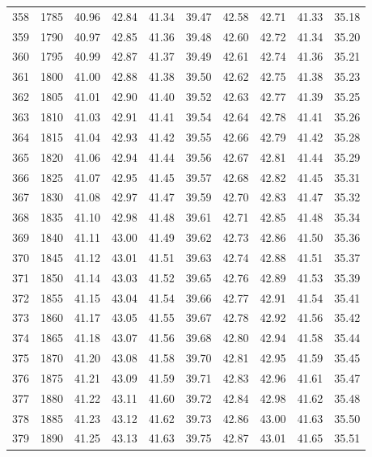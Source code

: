 \begin{longtable}{rrllllllll}
358 & 1785 & 40.96 & 42.84 & 41.34 & 39.47 & 42.58 & 42.71 & 41.33 & 35.18 \\ 
359 & 1790 & 40.97 & 42.85 & 41.36 & 39.48 & 42.60 & 42.72 & 41.34 & 35.20 \\ 
360 & 1795 & 40.99 & 42.87 & 41.37 & 39.49 & 42.61 & 42.74 & 41.36 & 35.21 \\ 
361 & 1800 & 41.00 & 42.88 & 41.38 & 39.50 & 42.62 & 42.75 & 41.38 & 35.23 \\ 
362 & 1805 & 41.01 & 42.90 & 41.40 & 39.52 & 42.63 & 42.77 & 41.39 & 35.25 \\ 
363 & 1810 & 41.03 & 42.91 & 41.41 & 39.54 & 42.64 & 42.78 & 41.41 & 35.26 \\ 
364 & 1815 & 41.04 & 42.93 & 41.42 & 39.55 & 42.66 & 42.79 & 41.42 & 35.28 \\ 
365 & 1820 & 41.06 & 42.94 & 41.44 & 39.56 & 42.67 & 42.81 & 41.44 & 35.29 \\ 
366 & 1825 & 41.07 & 42.95 & 41.45 & 39.57 & 42.68 & 42.82 & 41.45 & 35.31 \\ 
367 & 1830 & 41.08 & 42.97 & 41.47 & 39.59 & 42.70 & 42.83 & 41.47 & 35.32 \\ 
368 & 1835 & 41.10 & 42.98 & 41.48 & 39.61 & 42.71 & 42.85 & 41.48 & 35.34 \\ 
369 & 1840 & 41.11 & 43.00 & 41.49 & 39.62 & 42.73 & 42.86 & 41.50 & 35.36 \\ 
370 & 1845 & 41.12 & 43.01 & 41.51 & 39.63 & 42.74 & 42.88 & 41.51 & 35.37 \\ 
371 & 1850 & 41.14 & 43.03 & 41.52 & 39.65 & 42.76 & 42.89 & 41.53 & 35.39 \\ 
372 & 1855 & 41.15 & 43.04 & 41.54 & 39.66 & 42.77 & 42.91 & 41.54 & 35.41 \\ 
373 & 1860 & 41.17 & 43.05 & 41.55 & 39.67 & 42.78 & 42.92 & 41.56 & 35.42 \\ 
374 & 1865 & 41.18 & 43.07 & 41.56 & 39.68 & 42.80 & 42.94 & 41.58 & 35.44 \\ 
375 & 1870 & 41.20 & 43.08 & 41.58 & 39.70 & 42.81 & 42.95 & 41.59 & 35.45 \\ 
376 & 1875 & 41.21 & 43.09 & 41.59 & 39.71 & 42.83 & 42.96 & 41.61 & 35.47 \\ 
377 & 1880 & 41.22 & 43.11 & 41.60 & 39.72 & 42.84 & 42.98 & 41.62 & 35.48 \\ 
378 & 1885 & 41.23 & 43.12 & 41.62 & 39.73 & 42.86 & 43.00 & 41.63 & 35.50 \\ 
379 & 1890 & 41.25 & 43.13 & 41.63 & 39.75 & 42.87 & 43.01 & 41.65 & 35.51 \\ 

\end{longtable}
